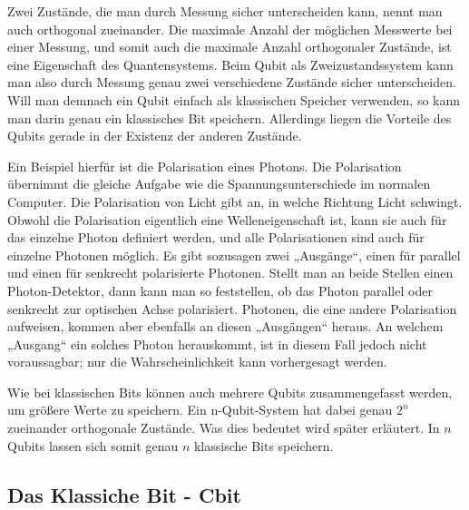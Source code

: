 \documentclass[a4paper,10pt]{scrartcl}
\begin{document}
Zwei Zustände, die man durch Messung sicher unterscheiden kann, nennt man auch orthogonal zueinander. Die maximale Anzahl der möglichen Messwerte bei einer Messung, und somit auch die maximale Anzahl orthogonaler Zustände, ist eine Eigenschaft des Quantensystems. Beim Qubit als Zweizustandssystem kann man also durch Messung genau zwei verschiedene Zustände sicher unterscheiden. Will man demnach ein Qubit einfach als klassischen Speicher verwenden, so kann man darin genau ein klassisches Bit speichern. Allerdings liegen die Vorteile des Qubits gerade in der Existenz der anderen Zustände.

Ein Beispiel hierfür ist die Polarisation eines Photons. Die Polarisation übernimmt die gleiche Aufgabe wie die Spannungsunterschiede im normalen Computer. Die Polarisation von Licht gibt an, in welche Richtung Licht schwingt. Obwohl die Polarisation eigentlich eine Welleneigenschaft ist, kann sie auch für das einzelne Photon definiert werden, und alle Polarisationen sind auch für einzelne Photonen möglich. Es gibt sozusagen zwei „Ausgänge“, einen für parallel und einen für senkrecht polarisierte Photonen. Stellt man an beide Stellen einen Photon-Detektor, dann kann man so feststellen, ob das Photon parallel oder senkrecht zur optischen Achse polarisiert.
Photonen, die eine andere Polarisation aufweisen, kommen aber ebenfalls an diesen „Ausgängen“ heraus. An welchem „Ausgang“ ein solches Photon herauskommt, ist in diesem Fall jedoch nicht voraussagbar; nur die Wahrscheinlichkeit kann vorhergesagt werden.

Wie bei klassischen Bits können auch mehrere Qubits zusammengefasst werden, um größere Werte zu speichern. Ein n-Qubit-System hat dabei genau  $2^{n}$ zueinander orthogonale Zustände. Was dies bedeutet wird später erläutert. In $n$ Qubits lassen sich somit genau $n$ klassische Bits speichern.

\subsection{Das Klassiche Bit - Cbit}
\end{document}
